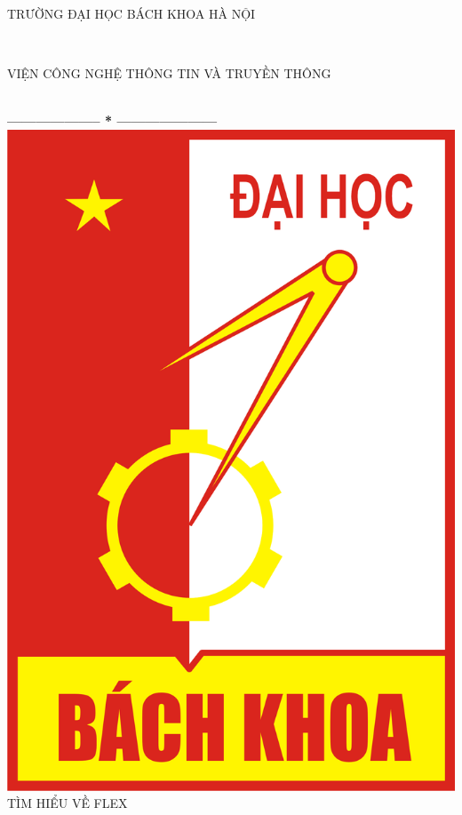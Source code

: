 \documentclass[12pt,a4paper]{article}
\begin{document}
\thispagestyle{empty}
\thisfancypage{
\setlength{\fboxsep}{0pt}
\fbox}{}
\begin{center}
\begin{large}
TRƯỜNG ĐẠI HỌC BÁCH KHOA HÀ NỘI
\end{large} \\
\begin{large}
VIỆN CÔNG NGHỆ THÔNG TIN VÀ TRUYỀN THÔNG
\end{large} \\

\textbf{--------------------  *  ---------------------}\\[1.5cm]
\includegraphics[scale=0.35]{12}
\\
\vspace{2cm}
{\fontsize{25pt}{1}\selectfont TÌM HIỂU VỀ \textsf{FLEX}}\\[2cm]
\end{center}
\end{document}
